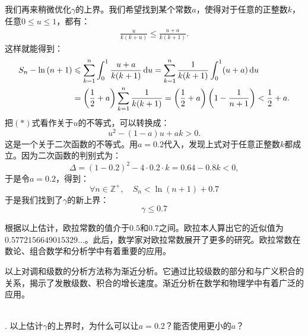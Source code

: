 \documentclass[12pt,UTF8]{ctexbook}
\begin{document}
\begin{so}
    我们再来稍微优化$\gamma$的上界。我们希望找到某个常数$a$，使得对于任意的正整数$k$，任意$0\leqslant u \leqslant 1$，都有：
    \begin{align*}
        \frac{u}{k(k + u)} \leqslant \frac{u + a}{k(k + 1)}. \tag{$\ast$}
    \end{align*}
    这样就能得到：
    \begin{align*}       
        S_n - \ln{(n+1)} &\leqslant \sum_{k=1}^{n} \int_0^{1} \frac{u + a}{k(k + 1)}\,\mathrm{d}u = \sum_{k=1}^{n} \frac{1}{k(k + 1)} \int_0^{1} (u + a)\,\mathrm{d}u \\
        &= \left(\frac{1}{2} + a\right) \sum_{k=1}^{n} \frac{1}{k(k + 1)} = \left(\frac{1}{2} + a\right) \left( 1 - \frac{1}{n+1} \right) < \frac{1}{2} + a.
    \end{align*}
    把$(\ast)$式看作关于$u$的不等式，可以转换成：
    $$ u^2 - (1 - a)u + ak > 0. $$
    这是一个关于二次函数的不等式。用$a = 0.2$代入，发现上式对于任意正整数$k$都成立。因为二次函数的判别式为：
    $$ \Delta = (1 - 0.2)^2 - 4\cdot 0.2\cdot k = 0.64 - 0.8k < 0, $$
    于是令$a=0.2$，得到：
    $$\forall n \in \mathbb{Z}^+, \quad S_n < \ln{(n+1)} + 0.7 $$
    于是我们找到了$\gamma$的新上界：
    $$ \gamma \leqslant 0.7 $$
    
    根据以上估计，欧拉常数的值介于$0.5$和$0.7$之间。欧拉本人算出它的近似值为$0.5772156649015329\dots$。此后，数学家对欧拉常数展开了更多的研究。欧拉常数在数论、组合数学和分析学中有着重要的应用。
\end{so}

以上对调和级数的分析方法称为渐近分析。它通过比较级数的部分和与广义积合的关系，揭示了发散级数、积合的增长速度。渐近分析在数学和物理学中有着广泛的应用。

\begin{sk}
    \mbox{} \\
    . 以上估计$\gamma$的上界时，为什么可以让$a=0.2$？能否使用更小的$a$？ \\
\end{sk}
\end{document}
